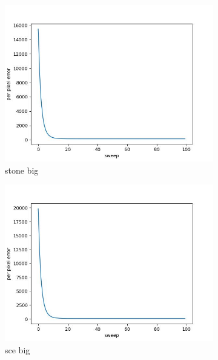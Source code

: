 \documentclass[11pt]{article}
\begin{document}
\begin{figure}[ht!]
    \centering
    \hfill%
    \begin{subfigure}[]{0.333\linewidth}
        \centering
        \includegraphics[width=\linewidth]{fig/loss/stone_big_loss.jpg}
        \caption{stone big}
    \end{subfigure}%
    \hfill%
    \begin{subfigure}[]{0.333\linewidth}
        \centering
        \includegraphics[width=\linewidth]{fig/loss/sce_big_loss.jpg}
        \caption{sce big}
    \end{subfigure}%
    \hfill%
    \begin{subfigure}[]{0.333\linewidth}
        \centering

\end{subfigure}
\end{figure}
\end{document}
